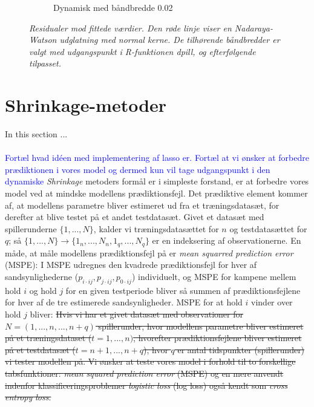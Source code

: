 \documentclass[11pt,a4paper]{article}
\begin{document}
\begin{figure}[h!]
\begin{subfigure}[b]{0.425\linewidth}
    \caption{Dynamisk med båndbredde 0.02}
    \label{fig:ResDU}
  \end{subfigure}
  \caption{\textit{Residualer mod fittede værdier. Den røde linje viser en Nadaraya-Watson udglatning med normal kerne. De tilhørende båndbredder er valgt med udgangspunkt i R-funktionen dpill, og efterfølgende tilpasset.}}
  \label{fig:residualplot}
\end{figure}
\clearpage
\section{Shrinkage-metoder}
In this section ...\\\\
\textcolor{blue}{Fortæl hvad idéen med implementering af lasso er. Fortæl at vi ønsker at forbedre prædiktionen i vores model og dermed kun vil tage udgangspunkt i den dynamiske}
\textit{Shrinkage} metoders formål er i simpleste forstand, er at forbedre vores model ved at mindske modellens prædiktionsfejl. Det prædiktive element kommer af, at modellens parametre bliver estimeret ud fra et træningsdatasæt, for derefter at blive testet på et andet testdatasæt. Givet et datasæt med spillerunderne $\{1,...,N\}$, kalder vi træningsdatasættet for $n$ og testdatasættet for $q$; så $\{1,...,N\}\rightarrow\{1_n,...,N_n,1_q,...,N_q\}$ er en indeksering af observationerne. En måde, at måle modellens prædiktionsfejl på er \textit{mean squarred prediction error} (MSPE): I MSPE udregnes den kvadrede prædiktionsfejl for hver af sandsynlighederne ($p_{i\cdot ij}, p_{j\cdot ij}, p_{0\cdot ij}$) individuelt, og MSPE for kampene mellem hold $i$ og hold $j$ for en given testperiode bliver så summen af prædiktionsfejlene for hver af de tre estimerede sandsynligheder. MSPE for at hold $i$ vinder over hold $j$ bliver:
\sout{Hvis vi har et givet datasæt med observationer for $N=(1,...,n,...,n+q)$ spillerunder, hvor modellens parametre bliver estimeret på et træningsdataset ($t=1,...,n)$, hvorefter prædiktionsfejlene bliver estimeret på et testdatasæt ($t=n+1,...,n+q$), hvor $q$ er antal tidspunkter (spillerunder) vi tester modellen på. Vi ønsker at teste vores model i forhold til to forskellige tabsfunktioner: \textit{mean squared prediction error} (MSPE) og en mere anvendt indenfor klassificeringsproblemer \textit{logistic loss} (log loss) også kendt som \textit{cross entropy loss}. }
\end{document}
